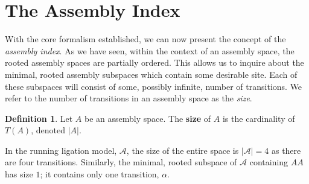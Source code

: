 \documentclass[aps,prd,onecolumn,nofootinbib,letterpaper,preprintnumbers,superscriptaddress,eqsecnum]{revtex4}
\theoremstyle{definition}
\newtheorem{definition}{Definition}
\newcommand{\A}{\mathcal{A}}
\begin{document}
\section{The Assembly Index}\label{sec:assembly-index}

With the core formalism established, we can now present the concept of the \textit{assembly index}.
As we have seen, within the context of an assembly space, the rooted assembly spaces are partially ordered.
This allows us to inquire about the minimal, rooted assembly subspaces which contain some desirable site.
Each of these subspaces will consist of some, possibly infinite, number of transitions.
We refer to the number of transitions in an assembly space as the \textit{size}.
\begin{definition}\label{def:size}
    Let $A$ be an assembly space.
    The \textbf{size} of $A$ is the cardinality of $T(A)$, denoted $|A|$.
\end{definition}
In the running ligation model, $\A$, the size of the entire space is $|\A| = 4$ as there are four transitions.
Similarly, the minimal, rooted subspace of $\A$ containing $AA$ has size $1$; it contains only one transition, $\alpha$.
\end{document}
